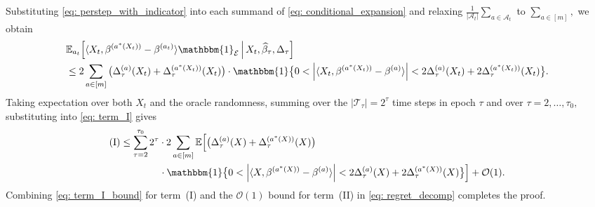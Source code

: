 \documentclass[mnsc]{informs3aa} %
\newcommand{\abs}[1]{\left|#1\right|}
\renewcommand{\hat}{\widehat}
\newcommand{\mA}{\mathcal A}
\newcommand{\mT}{\mathcal T}
\renewcommand{\hat}{\widehat}
\newcommand{\indi}{\mathbbm{1}}
\renewcommand{\hat}{\widehat}
\newcommand{\mO}{\mathcal O}
\newcommand{\mE}{\mathcal E}
\begin{document}
Substituting \eqref{eq: perstep_with_indicator} into each summand of \eqref{eq: conditional_expansion} and relaxing $\frac{1}{|\mA_t|}\sum_{a\in\mA_t}$ to $\sum_{a\in[m]},$ we obtain
\begin{align}
&\mathbb{E}_{a_t}\!\left[\langle X_t,\beta^{(a^*(X_t))}-\beta^{(a_t)}\rangle\indi_\mE\,\Big|\,X_t,\hat\beta_\tau,\Delta_\tau\right]\nonumber\\
&\leq 2\sum_{a\in[m]}\big(\Delta_\tau^{(a)}(X_t)+\Delta_\tau^{(a^*(X_t))}(X_t)\big)\cdot\indi\big\{0<\abs{\langle X_t,\beta^{(a^*(X_t))}-\beta^{(a)}\rangle}<2\Delta_\tau^{(a)}(X_t)+2\Delta_\tau^{(a^*(X_t))}(X_t)\big\}.\label{eq: transfer_step}
\end{align}
Taking expectation over both $X_t$ and the oracle randomness, summing over the $|\mT_\tau|=2^\tau$ time steps in epoch $\tau$ and over $\tau=2,\ldots,\tau_0,$ substituting into \eqref{eq: term_I} gives
\begin{align}
\text{(I)}&\leq \sum_{\tau=2}^{\tau_0}2^\tau\cdot 2\sum_{a\in[m]}\mathbb{E}\Big[\big(\Delta_\tau^{(a)}(X)+\Delta_\tau^{(a^*(X))}(X)\big)\nonumber\\
&\qquad\qquad\cdot\indi\big\{0<\abs{\langle X,\beta^{(a^*(X))}-\beta^{(a)}\rangle}<2\Delta_\tau^{(a)}(X)+2\Delta_\tau^{(a^*(X))}(X)\big\}\Big]+\mO(1).\label{eq: term_I_bound}
\end{align}
Combining \eqref{eq: term_I_bound} for term~(I) and the $\mO(1)$ bound for term~(II) in \eqref{eq: regret_decomp} completes the proof.
\end{document}
